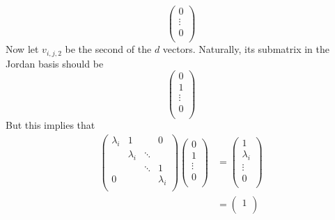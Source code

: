 \documentclass[../notes.tex]{subfiles}
\begin{document}
\begin{itemize}
\begin{enumerate}
\begin{enumerate}
\begin{equation*}
\begin{pmatrix}
                    0\\
                    \vdots\\
                    0\\
                \end{pmatrix}
            \end{equation*}
            Now let $v_{i,j,2}$ be the second of the $d$ vectors. Naturally, its submatrix in the Jordan basis should be
            \begin{equation*}
                \begin{pmatrix}
                    0\\
                    1\\
                    \vdots\\
                    0\\
                \end{pmatrix}
            \end{equation*}
            But this implies that
            \begin{align*}
                \begin{pmatrix}
                    \lambda_i & 1 &  & 0\\
                     & \lambda_i & \ddots & \\
                     &  & \ddots & 1\\
                    0 &  &  & \lambda_i\\
                \end{pmatrix}
                \begin{pmatrix}
                    0\\
                    1\\
                    \vdots\\
                    0\\
                \end{pmatrix}
                &=
                \begin{pmatrix}
                    1\\
                    \lambda_i\\
                    \vdots\\
                    0\\
                \end{pmatrix}\\
                &=
                \begin{pmatrix}
                    1\\

\end{pmatrix}
\end{align*}
\end{enumerate}
\end{enumerate}
\end{itemize}
\end{document}

